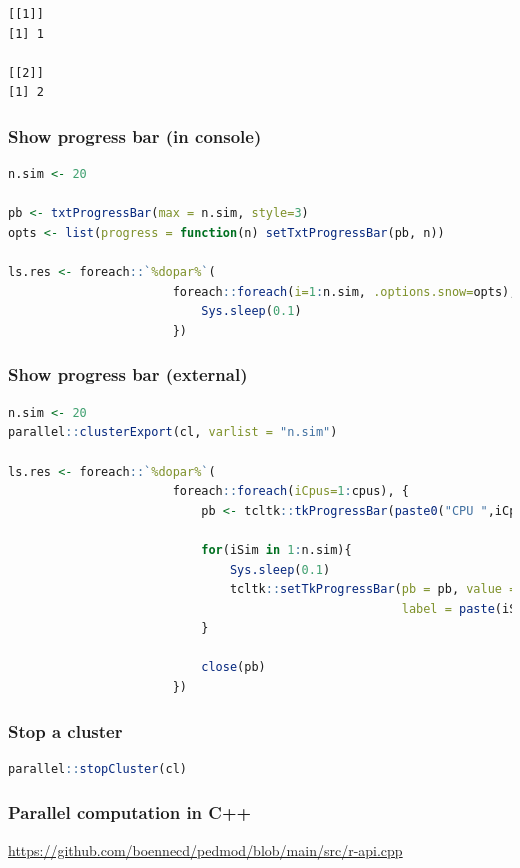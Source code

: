 \documentclass{article}
\begin{document}
\label{}
\begin{verbatim}
[[1]]
[1] 1

[[2]]
[1] 2
\end{verbatim}
\subsubsection{Show progress bar (in console)}
\label{sec:org5f5d029}

\begin{lstlisting}[language=r,numbers=none]
n.sim <- 20

pb <- txtProgressBar(max = n.sim, style=3)
opts <- list(progress = function(n) setTxtProgressBar(pb, n))

ls.res <- foreach::`%dopar%`(
                       foreach::foreach(i=1:n.sim, .options.snow=opts), {
                           Sys.sleep(0.1)
                       })
\end{lstlisting}
\subsubsection{Show progress bar (external)}
\label{sec:orgc4e1a40}

\begin{lstlisting}[language=r,numbers=none]
n.sim <- 20
parallel::clusterExport(cl, varlist = "n.sim")

ls.res <- foreach::`%dopar%`(
                       foreach::foreach(iCpus=1:cpus), {
                           pb <- tcltk::tkProgressBar(paste0("CPU ",iCpus), min = 0, max = n.sim, initial = 0)

                           for(iSim in 1:n.sim){
                               Sys.sleep(0.1)
                               tcltk::setTkProgressBar(pb = pb, value = iSim,
                                                       label = paste(iSim," over ",n.sim," iterations done") )
                           }

                           close(pb)
                       })
\end{lstlisting}
\subsubsection{Stop a cluster}
\label{sec:orgae7a975}

\begin{lstlisting}[language=r,numbers=none]
parallel::stopCluster(cl)
\end{lstlisting}
\subsubsection{Parallel computation in C++}
\label{sec:org9713023}
\url{https://github.com/boennecd/pedmod/blob/main/src/r-api.cpp}
\end{document}
